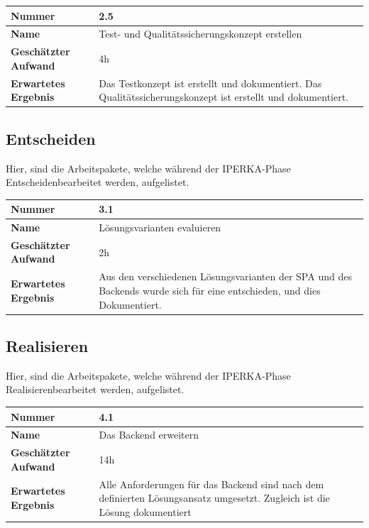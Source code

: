 \begin{longtable}{p{}|p{}}
	\hline
	\textbf{Nummer}    				& 2.5 \\
	\hline
	\textbf{Name}   				& Test- und Qualitätssicherungskonzept erstellen\\
	\hline
	\textbf{Geschätzter Aufwand}	& 4h \\
	\hline
	\textbf{Erwartetes Ergebnis}	& Das Testkonzept ist erstellt und dokumentiert. Das Qualitätssicherungskonzept ist erstellt und dokumentiert.\\
	\hline
\end{longtable}

\subsection{Entscheiden}
Hier, sind die Arbeitspakete, welche während der IPERKA-Phase \flqq Entscheiden\frqq{}\space bearbeitet werden, aufgelistet.

\begin{longtable}{p{}|p{}}
	\hline
	\textbf{Nummer}    				& 3.1 \\
	\hline
	\textbf{Name}   				& Lösungsvarianten evaluieren \\
	\hline
	\textbf{Geschätzter Aufwand}	& 2h \\
	\hline
	\textbf{Erwartetes Ergebnis}	& Aus den verschiedenen Lösungsvarianten der SPA und des Backends wurde sich für eine entschieden, und dies Dokumentiert.\\
	\hline
\end{longtable}\pagebreak

\subsection{Realisieren}
Hier, sind die Arbeitspakete, welche während der IPERKA-Phase \flqq Realisieren\frqq{}\space bearbeitet werden, aufgelistet.

\begin{longtable}{p{}|p{}}
	\hline
	\textbf{Nummer}    				& 4.1 \\
	\hline
	\textbf{Name}   				& Das Backend erweitern  \\
	\hline
	\textbf{Geschätzter Aufwand}	& 14h \\
	\hline
	\textbf{Erwartetes Ergebnis}	& Alle Anforderungen für das Backend sind nach dem definierten Lösungsansatz umgesetzt. Zugleich ist die Lösung dokumentiert \\
	\hline
\end{longtable}


